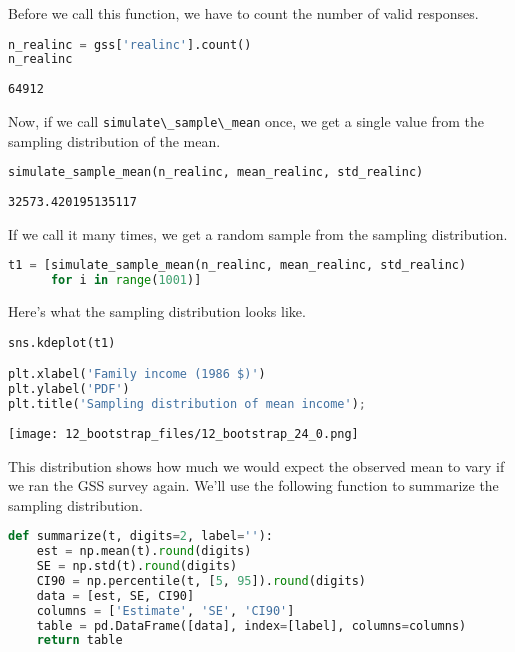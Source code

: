 Before we call this function, we have to count the number of valid
responses.

\begin{lstlisting}[language=Python,style=source]
n_realinc = gss['realinc'].count()
n_realinc
\end{lstlisting}

\begin{lstlisting}[style=output]
64912
\end{lstlisting}

Now, if we call \passthrough{\lstinline!simulate\_sample\_mean!} once,
we get a single value from the sampling distribution of the mean.

\begin{lstlisting}[language=Python,style=source]
simulate_sample_mean(n_realinc, mean_realinc, std_realinc)
\end{lstlisting}

\begin{lstlisting}[style=output]
32573.420195135117
\end{lstlisting}

If we call it many times, we get a random sample from the sampling
distribution.

\begin{lstlisting}[language=Python,style=source]
t1 = [simulate_sample_mean(n_realinc, mean_realinc, std_realinc)
      for i in range(1001)]
\end{lstlisting}

Here's what the sampling distribution looks like.

\begin{lstlisting}[language=Python,style=source]
sns.kdeplot(t1)

plt.xlabel('Family income (1986 $)')
plt.ylabel('PDF')
plt.title('Sampling distribution of mean income');
\end{lstlisting}

\begin{center}
\texttt{[image: 12\_bootstrap\_files/12\_bootstrap\_24\_0.png]}
\end{center}

This distribution shows how much we would expect the observed mean to
vary if we ran the GSS survey again. We'll use the following function to
summarize the sampling distribution.

\begin{lstlisting}[language=Python,style=source]
def summarize(t, digits=2, label=''):
    est = np.mean(t).round(digits)
    SE = np.std(t).round(digits)
    CI90 = np.percentile(t, [5, 95]).round(digits)
    data = [est, SE, CI90]
    columns = ['Estimate', 'SE', 'CI90']
    table = pd.DataFrame([data], index=[label], columns=columns)
    return table
\end{lstlisting}

